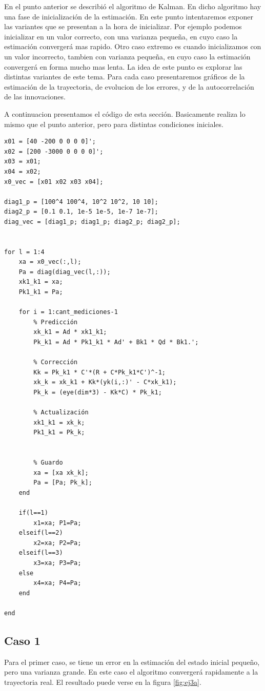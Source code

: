 
	En el punto anterior se describió el algoritmo de Kalman. En dicho algoritmo hay una fase de inicialización de la estimación. En este punto intentaremos exponer las variantes que se presentan a la hora de inicializar. Por ejemplo podemos inicializar en un valor correcto, con una varianza pequeña, en cuyo caso la estimación convergerá mas rapido. Otro caso extremo es cuando inicializamos con un valor incorrecto, tambien con varianza pequeña, en cuyo caso la estimación convergerá en forma mucho mas lenta. La idea de este punto es explorar las distintas variantes de este tema. Para cada caso presentaremos gráficos de la estimación de la trayectoria, de evolucion de los errores, y de la autocorrelación de las innovaciones.
	
	A continuacion presentamos el código de esta sección. Basicamente realiza lo mismo que el punto anterior, pero para distintas condiciones iniciales.

	\begin{lstlisting}[caption = Parte del \emph{Script} utilizado para el ejercicio 3]
% Nuevos datos
x01 = [40 -200 0 0 0 0]';
x02 = [200 -3000 0 0 0 0]';
x03 = x01;
x04 = x02;
x0_vec = [x01 x02 x03 x04];

diag1_p = [100^4 100^4, 10^2 10^2, 10 10];
diag2_p = [0.1 0.1, 1e-5 1e-5, 1e-7 1e-7];
diag_vec = [diag1_p; diag1_p; diag2_p; diag2_p];


for l = 1:4
	xa = x0_vec(:,l);
	Pa = diag(diag_vec(l,:));
	xk1_k1 = xa;
	Pk1_k1 = Pa;

	for i = 1:cant_mediciones-1
		% Predicción
		xk_k1 = Ad * xk1_k1;
		Pk_k1 =	Ad * Pk1_k1 * Ad' + Bk1 * Qd * Bk1.';
	
		% Corrección
		Kk = Pk_k1 * C'*(R + C*Pk_k1*C')^-1;
		xk_k = xk_k1 + Kk*(yk(i,:)' - C*xk_k1);
		Pk_k = (eye(dim*3) - Kk*C) * Pk_k1;
		
		% Actualización
		xk1_k1 = xk_k;
		Pk1_k1 = Pk_k;
	
	
		% Guardo
		xa = [xa xk_k];
		Pa = [Pa; Pk_k];
	end

	if(l==1)
		x1=xa; P1=Pa;
	elseif(l==2)
		x2=xa; P2=Pa;
	elseif(l==3)
		x3=xa; P3=Pa;
	else
		x4=xa; P4=Pa;
	end
	
end
	\end{lstlisting}
	
	\subsection{Caso 1}
	
		Para el primer caso, se tiene un error en la estimación del estado inicial pequeño, pero una varianza grande. En este caso el algoritmo convergerá rapidamente a la trayectoria real. El resultado puede verse en la figura \ref{fig:ej3a}.
	
